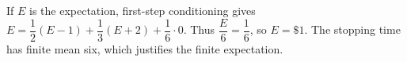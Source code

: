 If $E$ is the expectation, first-step conditioning gives $E=\dfrac{1}{2}(E-1)+\dfrac{1}{3}(E+2)+\dfrac{1}{6}\cdot0$. Thus $\dfrac{E}{6}=\dfrac{1}{6}$, so $\boxed{E=\$1}$. The stopping time has finite mean six, which justifies the finite expectation.
